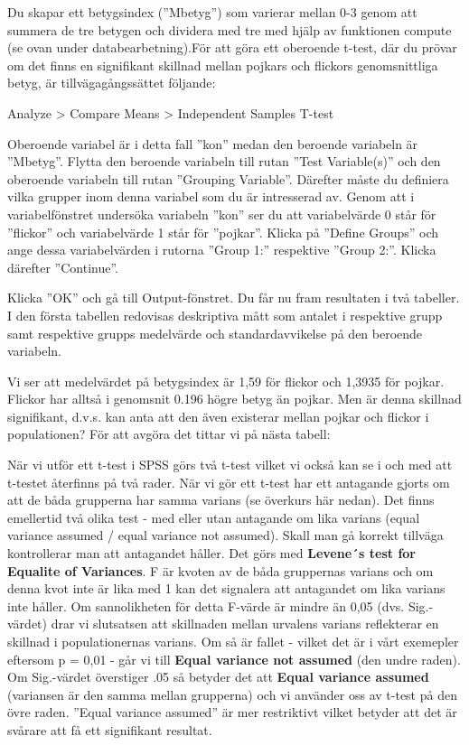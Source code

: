 \documentclass[
]{book}
\begin{document}
Du skapar ett betygsindex (''Mbetyg'') som varierar mellan 0-3 genom att summera de tre betygen
och dividera med tre med hjälp av funktionen compute (se ovan under databearbetning).För att göra ett oberoende t-test, där du prövar om det finns en signifikant skillnad mellan pojkars och
flickors genomsnittliga betyg, är tillvägagångssättet följande:

Analyze \textgreater{} Compare Means \textgreater{} Independent Samples T-test

Oberoende variabel är i detta fall ''kon'' medan den beroende variabeln är ''Mbetyg''. Flytta den
beroende variabeln till rutan ''Test Variable(s)'' och den oberoende variabeln till rutan ''Grouping
Variable''. Därefter måste du definiera vilka grupper inom denna variabel som du är intresserad av.
Genom att i variabelfönstret undersöka variabeln ''kon'' ser du att variabelvärde 0 står för ''flickor''
och variabelvärde 1 står för ''pojkar''. Klicka på ''Define Groups'' och ange dessa variabelvärden i
rutorna ''Group 1:'' respektive ''Group 2:''. Klicka därefter ''Continue''.

Klicka ''OK'' och gå till Output-fönstret. Du får nu fram resultaten i två tabeller. I den första tabellen
redovisas deskriptiva mått som antalet i respektive grupp samt respektive grupps medelvärde och
standardavvikelse på den beroende variabeln.

Vi ser att medelvärdet på betygsindex är 1,59 för flickor och 1,3935 för pojkar. Flickor har alltså i genomsnit 0.196 högre betyg än pojkar. Men är denna skillnad signifikant, d.v.s. kan anta att den även existerar mellan pojkar och
flickor i populationen? För att avgöra det tittar vi på nästa tabell:

När vi utför ett t-test i SPSS görs två t-test vilket vi också kan se i och med att t-testet återfinns på två rader. När vi gör ett t-test har ett antagande gjorts om att de båda grupperna har samma
varians (se överkurs här nedan). Det finns emellertid två olika test - med eller utan antagande om lika varians (equal variance
assumed / equal variance not assumed). Skall man gå korrekt tillväga kontrollerar man att antagandet
håller. Det görs med \textbf{Levene´s test for Equalite of Variances}. F är kvoten av de båda gruppernas varians
och om denna kvot inte är lika med 1 kan det signalera att antagandet om lika varians inte håller. Om
sannolikheten för detta F-värde är mindre än 0,05 (dvs. Sig.-värdet) drar vi slutsatsen att skillnaden mellan urvalens
varians reflekterar en skillnad i populationernas varians. Om så är fallet - vilket det är i vårt exemepler eftersom p = 0,01 - går vi till \textbf{Equal variance not assumed} (den undre raden). Om Sig.-värdet överstiger .05 så betyder det att \textbf{Equal variance assumed} (variansen är den samma mellan grupperna) och vi använder oss av t-test på den övre raden. ''Equal variance assumed'' är mer restriktivt vilket betyder att det är svårare att få ett signifikant resultat.
\end{document}
